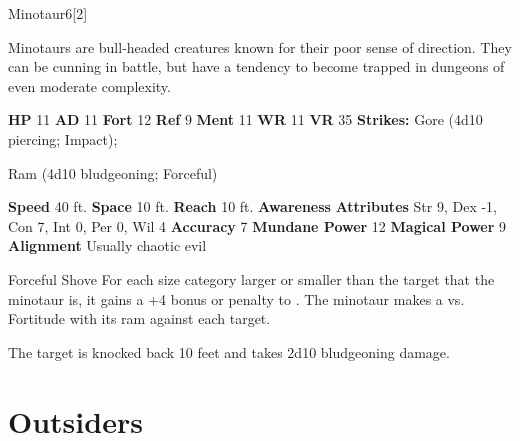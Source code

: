   \begin{monsection}{Minotaur}{6}[2]
    \vspace{-1em}\vspace{-1em}
    \vspace{0em}

    
      Minotaurs are bull-headed creatures known for their poor sense of direction.
      They can be cunning in battle, but have a tendency to become trapped in dungeons of even moderate complexity.
    
    

    \begin{spellcontent}
      \begin{spelltargetinginfo}
        \pari \textbf{HP} 11 \monsep
          \textbf{AD} 11 \monsep
          \textbf{Fort} 12 \monsep
          \textbf{Ref} 9 \monsep
          \textbf{Ment} 11
        \pari \textbf{WR} 11 \monsep
        \textbf{VR} 35
        \pari \textbf{Strikes:}
            Gore  (4d10 piercing; Impact);
\par Ram  (4d10 bludgeoning; Forceful)
      \end{spelltargetinginfo}
    \end{spellcontent}
    \begin{monsterfooter}
      \pari \textbf{Speed} 40 ft. \monsep
        \textbf{Space} 10 ft. \monsep
        \textbf{Reach} 10 ft.
      \pari \textbf{Awareness} 
      \pari \textbf{Attributes}
        Str 9, Dex -1,
        Con 7, Int 0,
        Per 0, Wil 4
      \pari \textbf{Accuracy} 7 \monsep
        \textbf{Mundane Power} 12 \monsep
      \textbf{Magical Power} 9
      \pari \textbf{Alignment} Usually chaotic evil
    \end{monsterfooter}
  \end{monsection}
  \begin{freeability}{Forceful Shove}
      For each size category larger or smaller than the target that the minotaur is, it gains a +4 bonus or penalty to . The minotaur makes a 
         vs. Fortitude
        with its ram against each target.
    
    \hit The target is knocked back 10 feet and takes 2d10 bludgeoning damage.
    \end{freeability}
  
        \section{Outsiders}

